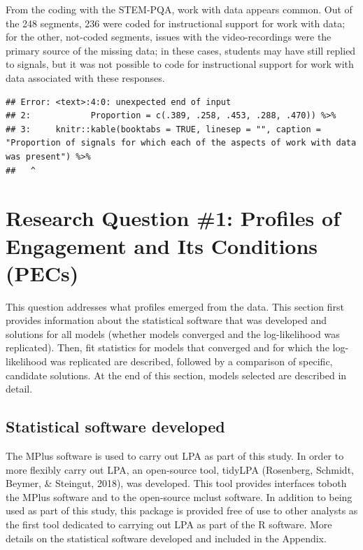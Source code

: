 \documentclass[]{msu-thesis}
\theoremstyle{definition}
\theoremstyle{definition}
\theoremstyle{definition}
\theoremstyle{remark}
\begin{document}
From the coding with the STEM-PQA, work with data appears common. Out of
the 248 segments, 236 were coded for instructional support for work with
data; for the other, not-coded segments, issues with the
video-recordings were the primary source of the missing data; in these
cases, students may have still replied to signals, but it was not
possible to code for instructional support for work with data associated
with these responses.

\begin{verbatim}
## Error: <text>:4:0: unexpected end of input
## 2:            Proportion = c(.389, .258, .453, .288, .470)) %>% 
## 3:     knitr::kable(booktabs = TRUE, linesep = "", caption = "Proportion of signals for which each of the aspects of work with data was present") %>% 
##   ^
\end{verbatim}

\section{Research Question \#1: Profiles of Engagement and Its
Conditions
(PECs)}\label{research-question-1-profiles-of-engagement-and-its-conditions-pecs}

This question addresses what profiles emerged from the data. This
section first provides information about the statistical software that
was developed and solutions for all models (whether models converged and
the log-likelihood was replicated). Then, fit statistics for models that
converged and for which the log-likelihood was replicated are described,
followed by a comparison of specific, candidate solutions. At the end of
this section, models selected are described in detail.

\subsection{Statistical software
developed}\label{statistical-software-developed}

The MPlus software is used to carry out LPA as part of this study. In
order to more flexibly carry out LPA, an open-source tool, tidyLPA
(Rosenberg, Schmidt, Beymer, \& Steingut, 2018), was developed. This
tool provides interfaces toboth the MPlus software and to the
open-source mclust software. In addition to being used as part of this
study, this package is provided free of use to other analysts as the
first tool dedicated to carrying out LPA as part of the R software. More
details on the statistical software developed and included in the
Appendix.
\end{document}
